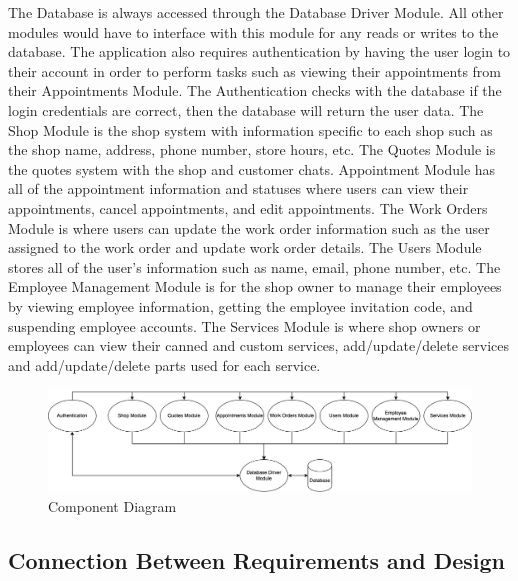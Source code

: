 \documentclass[12pt, titlepage]{article}
\begin{document}
The Database is always accessed through the Database Driver Module. All other modules would have to
interface with this module for any reads or writes to the database. The application also requires
authentication by having the user login to their account in order to perform tasks such as viewing
their appointments from their Appointments Module. The Authentication checks with the database if
the login credentials are correct, then the database will return the user data. The Shop Module is
the shop system with information specific to each shop such as the shop name, address, phone
number, store hours, etc. The Quotes Module is the quotes system with the shop and customer chats.
Appointment Module has all of the appointment information and statuses where users can view their
appointments, cancel appointments, and edit appointments. The Work Orders Module is where users can
update the work order information such as the user assigned to the work order and update work order
details. The Users Module stores all of the user's information such as name, email, phone number,
etc. The Employee Management Module is for the shop owner to manage their employees by viewing
employee information, getting the employee invitation code, and suspending employee accounts. The
Services Module is where shop owners or employees can view their canned and custom services,
add/update/delete services and add/update/delete parts used for each service.

\begin{figure}[H]
	\centering
	\includegraphics[width=\textwidth]{./diagrams/component-diagram.png}
	\caption{Component Diagram}
	\label{ComponentDiagram}
\end{figure}

\subsection{Connection Between Requirements and Design} \label{SecConnection}

\end{document}
